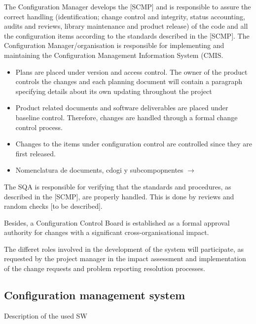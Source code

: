 \documentclass{template/openetcs_article}
\begin{document}
The Configuration Manager develops the [SCMP] and is responsible to assure the correct handling (identification; change control and integrity, status accounting, audits and reviews, library maintenance and product release) of the code and all the configuration items according to the standards described in the [SCMP]. The Configuration Manager/organisation is responsible for implementing and maintaining the Configuration Management Information System (CMIS.
\begin{itemize}
\item Plans are placed under version and access control. The owner of the product controls the changes and each planning document will contain a paragraph specifying details about its own updating throughout  the project 
\item Product related documents and software deliverables are placed under baseline control. Therefore, changes are handled through a formal change control process.
\item Changes to the items under configuration control are controlled since they are first released.
\item Nomenclatura de documents, c{\textasciiacute}dogi y subcompopnentes $\rightarrow$
\end{itemize}
The SQA is responsible for verifying that the standards and procedures, as described in the [SCMP], are properly handled. This is done by reviews and random checks [to be described].

Besides, a Configuration Control Board is established as a formal approval authority for changes with a significant cross-organisational impact.

The differet roles involved in the development of the system will participate, as requested by the project manager in the impact assessment and implementation of the change requests and problem reporting resolution processes.

\subsection{Configuration management system}
Description of the used SW 
\end{document}
